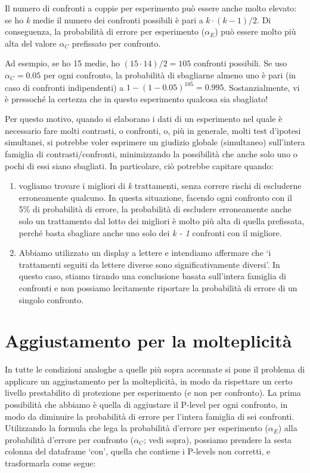 \documentclass[a4paper,12pt,oneside]{book}
\providecommand{\tightlist}{%
  \setlength{\itemsep}{0pt}\setlength{\parskip}{0pt}}
\begin{document}
Il numero di confronti a coppie per esperimento può essere anche molto elevato: se ho \emph{k} medie il numero dei confronti possibili è pari a \(k \cdot (k-1)/2\). Di conseguenza, la probabilità di errore per esperimento (\(\alpha_E\)) può essere molto più alta del valore \(\alpha_C\) prefissato per confronto.

Ad esempio, se ho 15 medie, ho \((15 \cdot 14)/2 = 105\) confronti possibili. Se uso \(\alpha_C = 0.05\) per ogni confronto, la probabilità di sbagliarne almeno uno è pari (in caso di confronti indipendenti) a \(1 - (1 - 0.05)^105 = 0.995\). Sostanzialmente, vi è pressoché la certezza che in questo esperimento qualcosa sia sbagliato!

Per questo motivo, quando si elaborano i dati di un esperimento nel quale è necessario fare molti contrasti, o confronti, o, più in generale, molti test d'ipotesi simultanei, si potrebbe voler esprimere un giudizio globale (simultaneo) sull'intera famiglia di contrasti/confronti, minimizzando la possibilità che anche solo uno o pochi di essi siano sbagliati. In particolare, ciò potrebbe capitare quando:

\begin{enumerate}
\def\labelenumi{\arabic{enumi}.}
\tightlist
\item
  vogliamo trovare i migliori di \emph{k} trattamenti, senza correre rischi di escluderne erroneamente qualcuno. In questa situazione, facendo ogni confronto con il 5\% di probabilità di errore, la probabilità di escludere erroneamente anche solo un trattamento dal lotto dei migliori è molto più alta di quella prefissata, perché basta sbagliare anche uno solo dei \emph{k - 1} confronti con il migliore.
\item
  Abbiamo utilizzato un display a lettere e intendiamo affermare che `i trattamenti seguiti da lettere diverse sono significativamente diversi'. In questo caso, stiamo tirando una conclusione basata sull'intera famiglia di confronti e non possiamo lecitamente riportare la probabilità di errore di un singolo confronto.
\end{enumerate}

\hypertarget{aggiustamento-per-la-molteplicituxe0}{%
\section{Aggiustamento per la molteplicità}\label{aggiustamento-per-la-molteplicituxe0}}

In tutte le condizioni analoghe a quelle più sopra accennate si pone il problema di applicare un aggiustamento per la molteplicità, in modo da rispettare un certo livello prestabilito di protezione per esperimento (e non per confronto). La prima possibilità che abbiamo è quella di aggiustare il P-level per ogni confronto, in modo da diminuire la probabilità di errore per l'intera famiglia di sei confronti. Utilizzando la formula che lega la probabilità d'errore per esperimento (\(\alpha_E\)) alla probabilità d'errore per confronto (\(\alpha_C\); vedi sopra), possiamo prendere la sesta colonna del dataframe `con', quella che contiene i P-levels non corretti, e trasformarla come segue:
\end{document}
